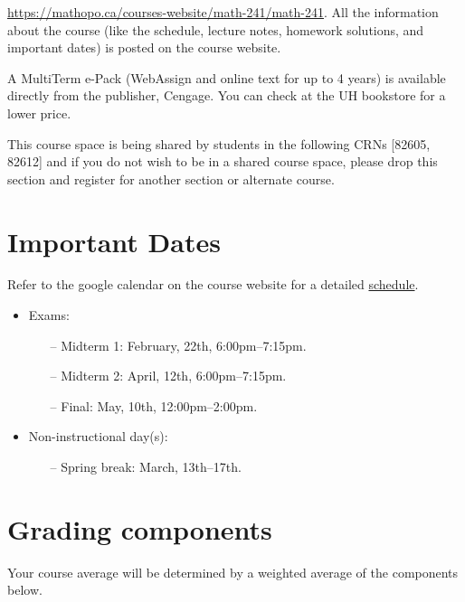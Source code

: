 \documentclass[12pt]{amsart}
\begin{document}
 \url{https://mathopo.ca/courses-website/math-241/math-241}. All the information about the course (like the schedule, lecture notes, homework solutions, and important dates) is posted on the course website.

 A MultiTerm e-Pack (WebAssign and online text for up to 4 years) is
available directly from the publisher, Cengage. You can check at the UH bookstore for a lower price.

 This course space is being shared by students in the following CRNs [82605, 82612] and if you do not wish to be in a shared course space, please drop this section and register for another section or alternate course.

\section*{Important Dates}
Refer to the google calendar on the course website for a detailed \href{https://mathopo.ca/courses-website/math-241/schedule}{schedule}.
	\begin{itemize}
	\item Exams:
		\begin{itemize}
		\item[--] Midterm 1: February, 22th, 6:00pm--7:15pm.
		\item[--] Midterm 2: April, 12th, 6:00pm--7:15pm.
		\item[--] Final: May, 10th, 12:00pm--2:00pm.
		\end{itemize}
	\item Non-instructional day(s):
		\begin{itemize}
		\item[--] Spring break: March, 13th--17th.
		\end{itemize}
	\end{itemize}
	
\newpage

\section*{Grading components}
Your course average will be determined by a weighted average of the components below.
\end{document}

